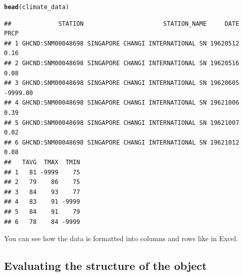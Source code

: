\documentclass{article}\usepackage[]{graphicx}\usepackage[]{color}
\makeatletter
\newcommand{\hlstd}[1]{\textcolor[rgb]{0.345,0.345,0.345}{#1}}%
\newcommand{\hlkwd}[1]{\textcolor[rgb]{0.737,0.353,0.396}{\textbf{#1}}}%
\newenvironment{kframe}{%
 \def\at@end@of@kframe{}%
 \ifinner\ifhmode%
  \def\at@end@of@kframe{\end{minipage}}%
  \begin{minipage}{\columnwidth}%
 \fi\fi%
 \def\FrameCommand##1{\hskip\@totalleftmargin \hskip-\fboxsep
 \colorbox{shadecolor}{##1}\hskip-\fboxsep
     \hskip-\linewidth \hskip-\@totalleftmargin \hskip\columnwidth}%
 \MakeFramed {\advance\hsize-\width
   \@totalleftmargin\z@ \linewidth\hsize
   \@setminipage}}%
 {\par\unskip\endMakeFramed%
 \at@end@of@kframe}
\newenvironment{knitrout}{}{} %
\makeatother
\begin{document}
\begin{knitrout}
\color{fgcolor}\begin{kframe}
\begin{alltt}
\hlkwd{head}\hlstd{(climate_data)}
\end{alltt}
\begin{verbatim}
##             STATION                      STATION_NAME     DATE     PRCP
## 1 GHCND:SNM00048698 SINGAPORE CHANGI INTERNATIONAL SN 19620512     0.16
## 2 GHCND:SNM00048698 SINGAPORE CHANGI INTERNATIONAL SN 19620516     0.08
## 3 GHCND:SNM00048698 SINGAPORE CHANGI INTERNATIONAL SN 19620605 -9999.00
## 4 GHCND:SNM00048698 SINGAPORE CHANGI INTERNATIONAL SN 19621006     0.39
## 5 GHCND:SNM00048698 SINGAPORE CHANGI INTERNATIONAL SN 19621007     0.02
## 6 GHCND:SNM00048698 SINGAPORE CHANGI INTERNATIONAL SN 19621012     0.08
##   TAVG  TMAX  TMIN
## 1   81 -9999    75
## 2   79    86    75
## 3   84    93    77
## 4   83    91 -9999
## 5   84    91    79
## 6   78    84 -9999
\end{verbatim}
\end{kframe}
\end{knitrout}
You can see how the data is formatted into columns and rows like in Excel. 

\subsection{Evaluating the structure of the object}
\end{document}

